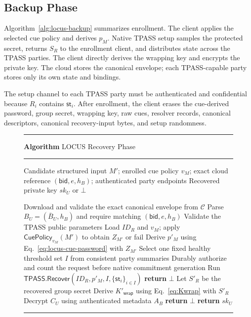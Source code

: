 \documentclass[sigconf,anonymous]{acmart}
\newcounter{protocol}
\renewcommand{\theprotocol}{\arabic{protocol}}
\newcommand{\protocolcaption}[1]{%
  \refstepcounter{protocol}%
  \vspace{2pt}\hrule\vspace{0.4ex}%
  {\raggedright\footnotesize\textbf{Algorithm \theprotocol} #1\par}%
  \vspace{0.4ex}\hrule\vspace{2pt}%
}
\newcommand{\TPASS}{\mathsf{TPASS}}
\begin{document}
\subsection{Backup Phase}

Algorithm~\ref{alg:locus-backup} summarizes enrollment. The client applies the
selected cue policy and derives \(p_M\). Native TPASS setup samples the protected
secret, returns \(S_R\) to the enrollment client, and distributes state across
the TPASS parties. The client directly derives the wrapping key and encrypts the
private key. The cloud stores the canonical envelope; each TPASS-capable party
stores only its own state and bindings.

The setup channel to each TPASS party must be authenticated and confidential
because \(R_i\) contains \(\mathsf{st}_i\). After enrollment, the client erases
the cue-derived password, group secret, wrapping key, raw cues, resolver records,
canonical descriptors, canonical recovery-input bytes, and setup randomness.

\begin{figure}[t]
\protocolcaption{LOCUS Recovery Phase}
\label{alg:locus-recovery}
\footnotesize
\begin{algorithmic}[1]
\REQUIRE Candidate structured input \(M'\); enrolled cue policy \(v_M\); exact cloud reference \((\mathsf{bid},e,h_B)\); authenticated party endpoints
\ENSURE Recovered private key \(sk_U\) or \(\bot\)

\STATE Download and validate the exact canonical envelope from \(\mathcal{C}\)
\STATE Parse \(B_U=(\bar B_U,h_B)\) and require matching \((\mathsf{bid},e,h_B)\)
\STATE Validate the TPASS public parameters
\STATE Load \(ID_R\) and \(v_M\); apply \(\mathsf{CuePolicy}_{v_M}(M')\) to obtain \(Z_{M'}\) or fail
\STATE Derive \(p'_M\) using Eq.~\eqref{eq:locus-cue-password} with \(Z_{M'}\)
\STATE Select one fixed healthy threshold set \(I\) from consistent party summaries
\STATE Durably authorize and count the request before native commitment generation
\STATE Run \(\TPASS.\mathsf{Recover}(ID_R,p'_M,I,\{\mathsf{st}_i\}_{i\in I})\)
    \STATE \textbf{return} \(\bot\)
\ENDIF
\STATE Let \(S'_R\) be the recovered group secret
\STATE Derive \(K'_{\mathsf{wrap}}\) using Eq.~\eqref{eq:Kwrap} with \(S'_R\)
\STATE Decrypt \(C_U\) using authenticated metadata \(A_B\)
    \STATE \textbf{return} \(\bot\)
\ELSE
    \STATE \textbf{return} \(sk_U\)
\ENDIF
\end{algorithmic}
\vspace{1pt}\hrule
\end{figure}
\end{document}
